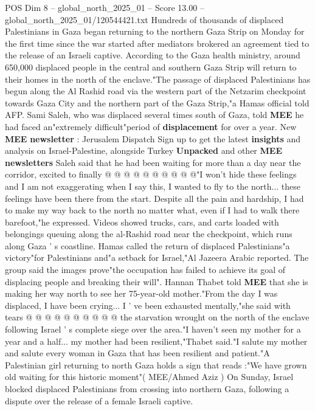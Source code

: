 \begin{textsample}{POS Dim 8 – global\_north\_2025\_01 – Score 13.00 – global\_north\_2025\_01/120544421.txt}  \label{ex:f8_pos_105}
Hundreds of thousands of displaced Palestinians in Gaza began returning to the northern Gaza Strip on Monday for the first time since the war started after mediators brokered an agreement tied to the release of an Israeli captive.
According to the Gaza health ministry, around 650,000 displaced people in the central and southern Gaza Strip will return to their homes in the north of the enclave."The passage of displaced Palestinians has begun along the Al Rashid road via the western part of the Netzarim checkpoint towards Gaza City and the northern part of the Gaza Strip,"a Hamas official told AFP.
Sami Saleh, who was displaced several times south of Gaza, told \textbf{MEE} he had faced an"extremely difficult"period of \textbf{displacement} for over a year.
New \textbf{MEE} \textbf{newsletter} : Jerusalem Dispatch Sign up to get the latest \textbf{insights} and analysis on Israel-Palestine, alongside Turkey \textbf{Unpacked} and other \textbf{MEE} \textbf{newsletters} Saleh said that he had been waiting for more than a day near the corridor, excited to finally @ @ @ @ @ @ @ @ @ @"I won't hide these feelings and I am not exaggerating when I say this, I wanted to fly to the north... these feelings have been there from the start.
Despite all the pain and hardship, I had to make my way back to the north no matter what, even if I had to walk there barefoot,"he expressed.
Videos showed trucks, cars, and carts loaded with belongings queuing along the al-Rashid road near the checkpoint, which runs along Gaza ' s coastline.
Hamas called the return of displaced Palestinians"a victory"for Palestinians and"a setback for Israel,"Al Jazeera Arabic reported.
The group said the images prove"the occupation has failed to achieve its goal of displacing people and breaking their will".
Hannan Thabet told \textbf{MEE} that she is making her way north to see her 75-year-old mother."From the day I was displaced, I have been crying...
I ' ve been exhausted mentally,"she said with tears @ @ @ @ @ @ @ @ @ @ the starvation wrought on the north of the enclave following Israel ' s complete siege over the area."I haven't seen my mother for a year and a half... my mother had been resilient,"Thabet said."I salute my mother and salute every woman in Gaza that has been resilient and patient."A Palestinian girl returning to north Gaza holds a sign that reads :"We have grown old waiting for this historic moment"( MEE/Ahmed Aziz ) On Sunday, Israel blocked displaced Palestinians from crossing into northern Gaza, following a dispute over the release of a female Israeli captive.

\end{textsample}
